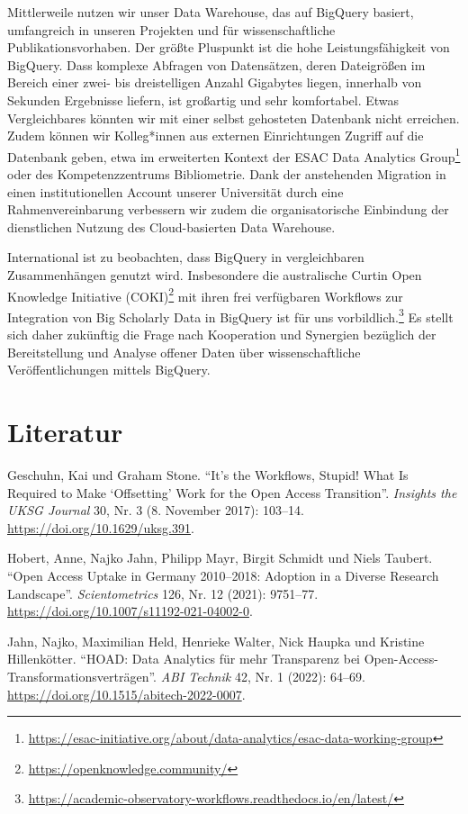 \documentclass[a4paper,
fontsize=11pt,
oneside,
numbers=noperiodatend,
parskip=half-,
bibliography=totoc,
final
]{scrartcl}
\begin{document}
Mittlerweile nutzen wir unser Data Warehouse, das auf BigQuery basiert,
umfangreich in unseren Projekten und für wissenschaftliche
Publikationsvorhaben. Der größte Pluspunkt ist die hohe
Leistungsfähigkeit von BigQuery. Dass komplexe Abfragen von Datensätzen,
deren Dateigrößen im Bereich einer zwei- bis dreistelligen Anzahl
Gigabytes liegen, innerhalb von Sekunden Ergebnisse liefern, ist
großartig und sehr komfortabel. Etwas Vergleichbares könnten wir mit
einer selbst gehosteten Datenbank nicht erreichen. Zudem können wir
Kolleg*innen aus externen Einrichtungen Zugriff auf die Datenbank geben,
etwa im erweiterten Kontext der ESAC Data Analytics Group\footnote{\url{https://esac-initiative.org/about/data-analytics/esac-data-working-group}}
oder des Kompetenzzentrums Bibliometrie. Dank der anstehenden Migration
in einen institutionellen Account unserer Universität durch eine
Rahmenvereinbarung verbessern wir zudem die organisatorische Einbindung
der dienstlichen Nutzung des Cloud-basierten Data Warehouse.

International ist zu beobachten, dass BigQuery in vergleichbaren
Zusammenhängen genutzt wird. Insbesondere die australische Curtin Open
Knowledge Initiative (COKI)\footnote{\url{https://openknowledge.community/}}
mit ihren frei verfügbaren Workflows zur Integration von Big Scholarly
Data in BigQuery ist für uns vorbildlich.\footnote{\url{https://academic-observatory-workflows.readthedocs.io/en/latest/}}
Es stellt sich daher zukünftig die Frage nach Kooperation und Synergien
bezüglich der Bereitstellung und Analyse offener Daten über
wissenschaftliche Veröffentlichungen mittels BigQuery.

\hypertarget{literatur}{%
\section{Literatur}\label{literatur}}

Geschuhn, Kai und Graham Stone. \enquote{It's the Workflows, Stupid!
What Is Required to Make \enquote*{Offsetting} Work for the Open Access
Transition}. \emph{Insights the UKSG Journal} 30, Nr. 3 (8. November
2017): 103--14. \url{https://doi.org/10.1629/uksg.391}.

Hobert, Anne, Najko Jahn, Philipp Mayr, Birgit Schmidt und Niels
Taubert. \enquote{Open Access Uptake in Germany 2010--2018: Adoption in
a Diverse Research Landscape}. \emph{Scientometrics} 126, Nr. 12 (2021):
9751--77. \url{https://doi.org/10.1007/s11192-021-04002-0}.

Jahn, Najko, Maximilian Held, Henrieke Walter, Nick Haupka und Kristine
Hillenkötter. \enquote{HOAD: Data Analytics für mehr Transparenz bei
Open-Access-Transformationsverträgen}. \emph{ABI Technik} 42, Nr. 1
(2022): 64--69. \url{https://doi.org/10.1515/abitech-2022-0007}.
\end{document}
